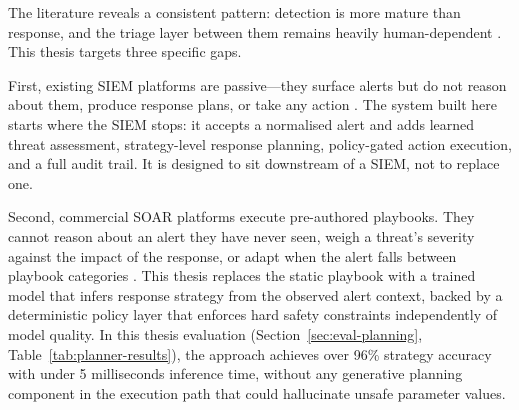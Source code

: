 The literature reveals a consistent pattern: detection is more mature than response, and the triage layer between them remains heavily human-dependent \cite{nist80061, tilbury2024humans, ban2023alertfatigue}. This thesis targets three specific gaps.

First, existing SIEM platforms are passive---they surface alerts but do not reason about them, produce response plans, or take any action \cite{nist80092, nist80061}. The system built here starts where the SIEM stops: it accepts a normalised alert and adds learned threat assessment, strategy-level response planning, policy-gated action execution, and a full audit trail. It is designed to sit downstream of a SIEM, not to replace one.

Second, commercial SOAR platforms execute pre-authored playbooks. They cannot reason about an alert they have never seen, weigh a threat's severity against the impact of the response, or adapt when the alert falls between playbook categories \cite{nist80061, tilbury2024humans}. This thesis replaces the static playbook with a trained model that infers response strategy from the observed alert context, backed by a deterministic policy layer that enforces hard safety constraints independently of model quality. In this thesis evaluation (Section~\ref{sec:eval-planning}, Table~\ref{tab:planner-results}), the approach achieves over 96\% strategy accuracy with under 5 milliseconds inference time, without any generative planning component in the execution path that could hallucinate unsafe parameter values.
